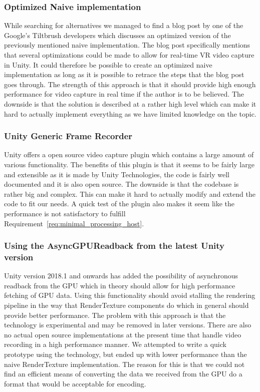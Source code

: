 \subsubsection{Optimized Naive implementation}
While searching for alternatives we managed to find a blog post\cite{google_vrCaptureBlog} by one of the Google's Tiltbrush developers which discusses an optimized version of the previously mentioned naive implementation. The blog post specifically mentions that several optimizations could be made to allow for real-time VR video capture in Unity. It could therefore be possible to create an optimized naive implementation as long as it is possible to retrace the steps that the blog post goes through. The strength of this approach is that it should provide high enough performance for video capture in real time if the author is to be believed. The downside is that the solution is described at a rather high level which can make it hard to actually implement everything as we have limited knowledge on the topic. 

\subsubsection{Unity Generic Frame Recorder}
Unity offers a open source video capture plugin\cite{unity_genericFrameRecprder} which contains a large amount of various functionality. The benefits of this plugin is that it seems to be fairly large and extensible as it is made by Unity Technologies, the code is fairly well documented and it is also open source. The downside is that the codebase is rather big and complex. This can make it hard to actually modify and extend the code to fit our needs. A quick test of the plugin also makes it seem like the performance is not satisfactory to fulfill Requirement~\ref{req:minimal_processing_host}.

\subsubsection{Using the AsyncGPUReadback from the latest Unity version}
Unity version 2018.1 and onwards has added the possibility of asynchronous readback from the GPU\cite{unity_asyncReadback} which in theory should allow for high performance fetching of GPU data. Using this functionality should avoid stalling the rendering pipeline in the way that RenderTexture components do which in general should provide better performance. The problem with this approach is that the technology is experimental and may be removed in later versions. There are also no actual open source implementations at the present time that handle video recording in a high performance manner. We attempted to write a quick prototype using the technology, but ended up with lower performance than the naive RenderTexture implementation. The reason for this is that we could not find an efficient means of converting the data we received from the GPU do a format that would be acceptable for encoding. 

